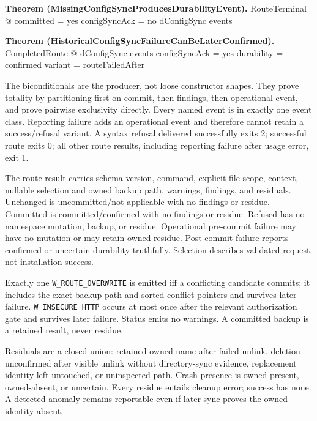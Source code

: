 \documentclass{article}
\makeatletter
\newenvironment{theorem}[1]{\medskip\noindent\textbf{Theorem (#1).}\@nameuse{zed}}{\@nameuse{endzed}}
\makeatother
\begin{document}
\begin{theorem}{MissingConfigSyncProducesDurabilityEvent}
	\forall RouteTerminal @ committed = yes \land configSyncAck = no
	\implies dConfigSync \in events
\end{theorem}

\begin{theorem}{HistoricalConfigSyncFailureCanBeLaterConfirmed}
	\exists CompletedRoute @ dConfigSync \in events \land
	configSyncAck = yes \land durability = confirmed \land
	variant = routeFailedAfter
\end{theorem}

The biconditionals are the producer, not loose constructor shapes.  They prove
totality by partitioning first on commit, then findings, then operational event,
and prove pairwise exclusivity directly.  Every named event is in exactly one
event class.  Reporting failure adds an operational event and therefore cannot
retain a success/refusal variant.  A syntax refusal delivered successfully exits
2; successful route exits 0; all other route results, including reporting
failure after usage error, exit 1.

The route result carries schema version, command, explicit-file scope, context,
nullable selection and owned backup path, warnings, findings, and residuals.
Unchanged is uncommitted/not-applicable with no findings or residue.  Committed
is committed/confirmed with no findings or residue.  Refused has no namespace
mutation, backup, or residue.  Operational pre-commit failure may have no
mutation or may retain owned residue.  Post-commit failure reports confirmed or
uncertain durability truthfully.  Selection describes validated request, not
installation success.

Exactly one \texttt{W\_ROUTE\_OVERWRITE} is emitted iff a conflicting candidate
commits; it includes the exact backup path and sorted conflict pointers and
survives later failure.  \texttt{W\_INSECURE\_HTTP} occurs at most once after
the relevant authorization gate and survives later failure.  Status emits no
warnings.  A committed backup is a retained result, never residue.

Residuals are a closed union: retained owned name after failed unlink,
deletion-unconfirmed after visible unlink without directory-sync evidence,
replacement identity left untouched, or uninspected path.  Crash presence is
owned-present, owned-absent, or uncertain.  Every residue entails cleanup error;
success has none.  A detected anomaly remains reportable even if later sync
proves the owned identity absent.
\end{document}
